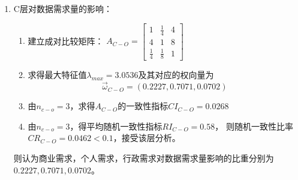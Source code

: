 \documentclass[UTF8,12pt]{ctexart}
\begin{document}
        \begin{enumerate}
            \item C层对数据需求量的影响：
            \begin{enumerate}
                \item 建立成对比较矩阵：
                $A_{C-O}=\begin{bmatrix}
                    1 & \frac{1}{4} & 4 \\                    
                    4 & 1 & 8\\                  
                    \frac{1}{4} & \frac{1}{8} & 1
                 \end{bmatrix}$
                \item 求得最大特征值$\lambda _{max}=3.0536$及其对应的权向量为
                    $$\overrightarrow\omega_{C-O}=(0.2227,0.7071,0.0702)$$
                \item 由$n_{c-o}=3$，求得$A_{C-O}$的一致性指标$CI_{C-O}=0.0268$
                \item 由$n_{c-o}=3$，得平均随机一致性指标$RI_{C-O}=0.58$，
                    则随机一致性比率$CR_{C-O}=0.0462<0.1$，接受该层分析。\\
            \end{enumerate}
            则认为商业需求，个人需求，行政需求对数据需求量影响的比重分别为$0.2227,0.7071,0.0702$。
              

\end{enumerate}
\end{document}
